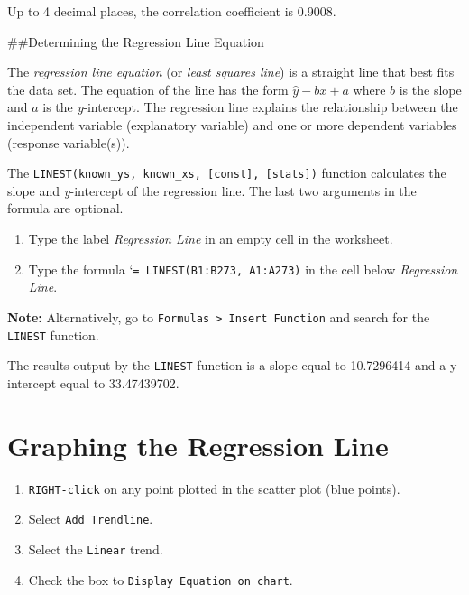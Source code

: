 \documentclass[
]{book}
\providecommand{\tightlist}{%
  \setlength{\itemsep}{0pt}\setlength{\parskip}{0pt}}
\begin{document}
Up to 4 decimal places, the correlation coefficient is 0.9008.

\#\#Determining the Regression Line Equation

The \emph{regression line equation} (or \emph{least squares line}) is a straight line that best fits the data set. The equation of the line has the form \(\hat{y}-bx+a\) where \(b\) is the slope and \(a\) is the \emph{y}-intercept. The regression line explains the relationship between the independent variable (explanatory variable) and one or more dependent variables (response variable(s)).

The \texttt{LINEST(known\_y\textquotesingle{}s,\ known\_x\textquotesingle{}s,\ {[}const{]},\ {[}stats{]})} function calculates the slope and \emph{y}-intercept of the regression line. The last two arguments in the formula are optional.

\begin{enumerate}
\def\labelenumi{\arabic{enumi}.}
\tightlist
\item
  Type the label \emph{Regression Line} in an empty cell in the worksheet.
\item
  Type the formula `\texttt{=\ LINEST(B1:B273,\ A1:A273)} in the cell below \emph{Regression Line}.
\end{enumerate}

\textbf{Note:} Alternatively, go to \texttt{Formulas\ \textgreater{}\ Insert\ Function} and search for the \texttt{LINEST} function.

The results output by the \texttt{LINEST} function is a slope equal to 10.7296414 and a y-intercept equal to 33.47439702.

\hypertarget{graphing-the-regression-line}{%
\section{Graphing the Regression Line}\label{graphing-the-regression-line}}

\begin{enumerate}
\def\labelenumi{\arabic{enumi}.}
\tightlist
\item
  \texttt{RIGHT-click} on any point plotted in the scatter plot (blue points).
\item
  Select \texttt{Add\ Trendline}.
\item
  Select the \texttt{Linear} trend.
\item
  Check the box to \texttt{Display\ Equation\ on\ chart}.
\end{enumerate}
\end{document}
